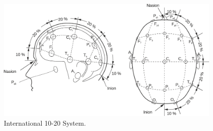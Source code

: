 \documentclass[12pt]{article}
\numberwithin{equation}{section}
\numberwithin{figure}{section}
\numberwithin{table}{section}
\begin{document}
\begin{figure}[ht]
    \centering
    \includegraphics[scale=0.75]{images/10_20_bembook_redrawn}
    \caption[International 10-20 System]{International 10-20 System. \citep{nicolas-alonso_brain_2012}}
    \label{fig:eeg_1020}
\end{figure}
\end{document}
